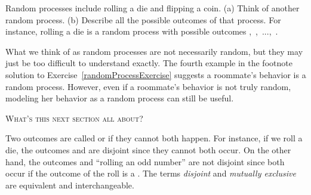 \documentclass{ccg-topic}
\begin{document}
\begin{todo} \label{randomProcessExercise}
Random processes include rolling a die and flipping a coin. (a) Think of another random process. (b) Describe all the possible outcomes of that process. For instance, rolling a die is a random process with possible outcomes \mbox{, , ..., }.\footnotemark
\end{todo}

What we think of as random processes are not necessarily random, but they may just be too difficult to understand exactly. The fourth example in the footnote solution to Exercise~\ref{randomProcessExercise} suggests a roommate's behavior is a random process. However, even if a roommate's behavior is not truly random, modeling her behavior as a random process can still be useful. 



\vspace{1em}\noindent\textsc{What's this next section all about?} 

Two outcomes are called  or  if they cannot both happen. For instance, if we roll a die, the outcomes  and  are disjoint since they cannot both occur. On the other hand, the outcomes  and ``rolling an odd number'' are not disjoint since both occur if the outcome of the roll is a . The terms \emph{disjoint} and \emph{mutually exclusive} are equivalent and interchangeable.
\end{document}
